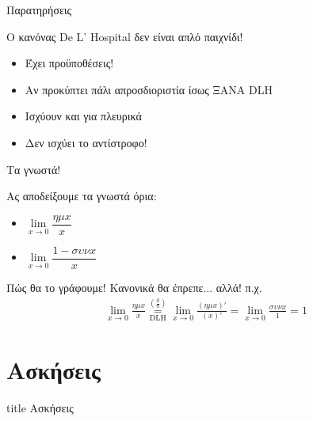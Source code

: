 \documentclass{presentation}
\begin{document}
\begin{frame}{Παρατηρήσεις}

    Ο κανόνας De L' Hospital δεν είναι απλό παιχνίδι!

    \begin{itemize}[<+->]
        \item Έχει προϋποθέσεις!
        \item Αν προκύπτει πάλι απροσδιοριστία ίσως ΞΑΝΑ DLH
        \item Ισχύουν και για πλευρικά
        \item Δεν ισχύει το αντίστροφο!
    \end{itemize}

\end{frame}

\begin{frame}{Τα γνωστά!}

    Ας αποδείξουμε τα γνωστά όρια:

    \begin{itemize}[<+->]
        \item $\lim\limits_{x \to 0}{ \dfrac{ημx}{x} }$
        \item $\lim\limits_{x \to 0}{ \dfrac{1-συνx}{x} }$
    \end{itemize}

\end{frame}

\begin{frame}{Πώς θα το γράφουμε!}
    Κανονικά θα έπρεπε... αλλά! π.χ.
    \begin{align*}
        \lim\limits_{x \to 0}{ \frac{ημx}{x} }\underset{\text{DLH}}{\overset{\left( \frac{0}{0} \right) }{=}} \lim\limits_{x \to 0}{ \frac{(ημx)'}{(x)'} }=\lim\limits_{x \to 0}{ \frac{συνx}{1} }=1
    \end{align*}
\end{frame}

\section{Ασκήσεις}

\begin{frame}[noframenumbering]
    \vfill
    \centering
    \begin{beamercolorbox}[sep=8pt,center,shadow=true,rounded=true]{title}
        Ασκήσεις
    \end{beamercolorbox}
    \vfill
\end{frame}
\end{document}
